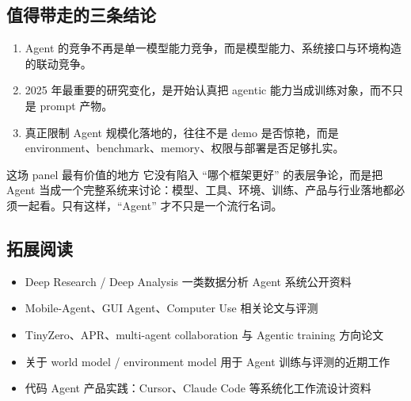 \documentclass[a4paper]{article}
\begin{document}
\subsection{值得带走的三条结论}
\begin{enumerate}
  \item Agent 的竞争不再是单一模型能力竞争，而是模型能力、系统接口与环境构造的联动竞争。
  \item 2025 年最重要的研究变化，是开始认真把 agentic 能力当成训练对象，而不只是 prompt 产物。
  \item 真正限制 Agent 规模化落地的，往往不是 demo 是否惊艳，而是 environment、benchmark、memory、权限与部署是否足够扎实。
\end{enumerate}

\begin{importantbox}{这场 panel 最有价值的地方}
它没有陷入 ``哪个框架更好'' 的表层争论，而是把 Agent 当成一个完整系统来讨论：模型、工具、环境、训练、产品与行业落地都必须一起看。只有这样，``Agent'' 才不只是一个流行名词。
\end{importantbox}

\subsection{拓展阅读}
\begin{itemize}
  \item Deep Research / Deep Analysis 一类数据分析 Agent 系统公开资料
  \item Mobile-Agent、GUI Agent、Computer Use 相关论文与评测
  \item TinyZero、APR、multi-agent collaboration 与 Agentic training 方向论文
  \item 关于 world model / environment model 用于 Agent 训练与评测的近期工作
  \item 代码 Agent 产品实践：Cursor、Claude Code 等系统化工作流设计资料
\end{itemize}
\end{document}
